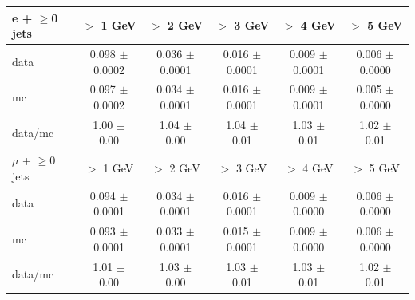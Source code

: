 \begin{table}[!ht]
\begin{center}
\begin{tabular}{l|c|c|c|c|c}


\hline
\hline
e + $\geq$0 jets   &           $>$ 1 GeV   &           $>$ 2 GeV   &           $>$ 3 GeV   &           $>$ 4 GeV   &           $>$ 5 GeV  \\
\hline
      data   &  0.098 $\pm$ 0.0002   &  0.036 $\pm$ 0.0001   &  0.016 $\pm$ 0.0001   &  0.009 $\pm$ 0.0001   &  0.006 $\pm$ 0.0000  \\
        mc   &  0.097 $\pm$ 0.0002   &  0.034 $\pm$ 0.0001   &  0.016 $\pm$ 0.0001   &  0.009 $\pm$ 0.0001   &  0.005 $\pm$ 0.0000  \\
   data/mc   &     1.00 $\pm$ 0.00   &     1.04 $\pm$ 0.00   &     1.04 $\pm$ 0.01   &     1.03 $\pm$ 0.01   &     1.02 $\pm$ 0.01  \\

\hline
\hline
$\mu$ + $\geq$0 jets   &           $>$ 1 GeV   &           $>$ 2 GeV   &           $>$ 3 GeV   &           $>$ 4 GeV   &           $>$ 5 GeV  \\
\hline
      data   &  0.094 $\pm$ 0.0001   &  0.034 $\pm$ 0.0001   &  0.016 $\pm$ 0.0001   &  0.009 $\pm$ 0.0000   &  0.006 $\pm$ 0.0000  \\
        mc   &  0.093 $\pm$ 0.0001   &  0.033 $\pm$ 0.0001   &  0.015 $\pm$ 0.0001   &  0.009 $\pm$ 0.0000   &  0.006 $\pm$ 0.0000  \\
   data/mc   &     1.01 $\pm$ 0.00   &     1.03 $\pm$ 0.00   &     1.03 $\pm$ 0.01   &     1.03 $\pm$ 0.01   &     1.02 $\pm$ 0.01  \\


\end{tabular}
\end{center}
\end{table}
